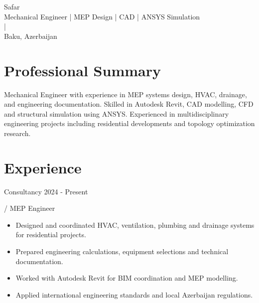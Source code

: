 \documentclass[11pt]{article}
\begin{document}
\begin{center}
{\Large \textbfAzer Safar}\\
Mechanical Engineer | MEP Design | CAD | ANSYS Simulation\\
 | \\
Baku, Azerbaijan
\end{center}

\vspace{8pt}

\section*{Professional Summary}

Mechanical Engineer with experience in MEP systems design, HVAC, drainage, and engineering documentation. Skilled in Autodesk Revit, CAD modelling, CFD and structural simulation using ANSYS. Experienced in multidisciplinary engineering projects including residential developments and topology optimization research.


\section*{Experience}



\textbfEngineering Consultancy \hfill 2024 - Present

\textitMechanical / MEP Engineer


\begin{itemize}[leftmargin=*]
\item Designed and coordinated HVAC, ventilation, plumbing and drainage systems for residential projects.
\end{itemize}

\begin{itemize}[leftmargin=*]
\item Prepared engineering calculations, equipment selections and technical documentation.
\end{itemize}

\begin{itemize}[leftmargin=*]
\item Worked with Autodesk Revit for BIM coordination and MEP modelling.
\end{itemize}

\begin{itemize}[leftmargin=*]
\item Applied international engineering standards and local Azerbaijan regulations.
\end{itemize}
\end{document}
